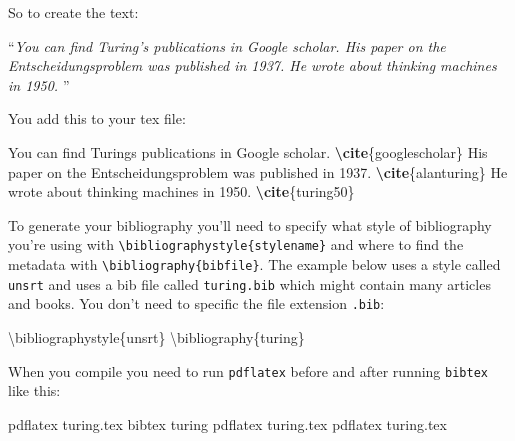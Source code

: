 \documentclass[
]{book}
\newenvironment{Shaded}{\begin{snugshade}}{\end{snugshade}}
\newcommand{\BuiltInTok}[1]{#1}
\newcommand{\ExtensionTok}[1]{#1}
\newcommand{\KeywordTok}[1]{\textcolor[rgb]{0.13,0.29,0.53}{\textbf{#1}}}
\newcommand{\NormalTok}[1]{#1}
\begin{document}
So to create the text:

``\emph{You can find Turing's publications in Google scholar. \citep{googlescholar}
His paper on the Entscheidungsproblem was published in 1937. \citep{turing}
He wrote about thinking machines in 1950. \citep{turing50}}''

You add this to your tex file:

\begin{Shaded}
\begin{Highlighting}[]
\NormalTok{You can find Turing\textquotesingle{}s publications in Google scholar. }\KeywordTok{\textbackslash{}cite}\NormalTok{\{}\ExtensionTok{googlescholar}\NormalTok{\}}
\NormalTok{His paper on the Entscheidungsproblem was published in 1937. }\KeywordTok{\textbackslash{}cite}\NormalTok{\{}\ExtensionTok{alanturing}\NormalTok{\}}
\NormalTok{He wrote about thinking machines in 1950. }\KeywordTok{\textbackslash{}cite}\NormalTok{\{}\ExtensionTok{turing50}\NormalTok{\}}
\end{Highlighting}
\end{Shaded}

To generate your bibliography you'll need to specify what style of bibliography you're using with \texttt{\textbackslash{}bibliographystyle\{stylename\}} and where to find the metadata with \texttt{\textbackslash{}bibliography\{bibfile\}}. The example below uses a style called \texttt{unsrt} and uses a bib file called \texttt{turing.bib} which might contain many articles and books. You don't need to specific the file extension \texttt{.bib}:

\begin{Shaded}
\begin{Highlighting}[]
\BuiltInTok{\textbackslash{}bibliographystyle}\NormalTok{\{}\ExtensionTok{unsrt}\NormalTok{\}}
\BuiltInTok{\textbackslash{}bibliography}\NormalTok{\{}\ExtensionTok{turing}\NormalTok{\}}
\end{Highlighting}
\end{Shaded}

When you compile you need to run \texttt{pdflatex} before and after running \texttt{bibtex} like this:

\begin{Shaded}
\begin{Highlighting}[]
\NormalTok{pdflatex turing.tex}
\NormalTok{bibtex turing}
\NormalTok{pdflatex turing.tex}
\NormalTok{pdflatex turing.tex}
\end{Highlighting}
\end{Shaded}
\end{document}
